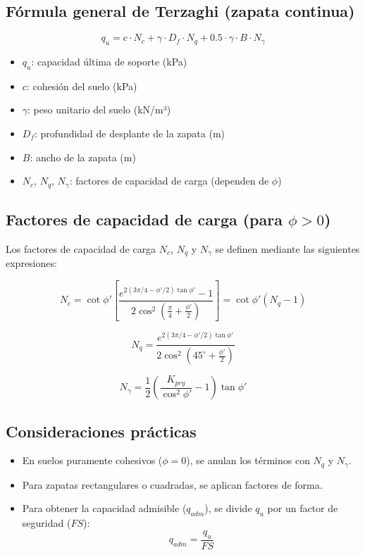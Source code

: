 \documentclass{article} %
\begin{document}
\subsection*{Fórmula general de Terzaghi (zapata continua)}

\[
q_u = c \cdot N_c + \gamma \cdot D_f \cdot N_q + 0.5 \cdot \gamma \cdot B \cdot N_\gamma
\]

\begin{itemize}
    \item $q_u$: capacidad última de soporte (kPa)
    \item $c$: cohesión del suelo (kPa)
    \item $\gamma$: peso unitario del suelo (kN/m³)
    \item $D_f$: profundidad de desplante de la zapata (m)
    \item $B$: ancho de la zapata (m)
    \item $N_c$, $N_q$, $N_\gamma$: factores de capacidad de carga (dependen de $\phi$)
\end{itemize}

\subsection*{Factores de capacidad de carga (para $\phi > 0$)}

Los factores de capacidad de carga $N_c$, $N_q$ y $N_\gamma$ se definen mediante las siguientes expresiones:

\begin{equation}
N_c = \cot \phi' \left[ 
\frac{e^{2(3\pi/4 - \phi'/2)\tan \phi'} - 1}{2 \cos^2\left( \frac{\pi}{4} + \frac{\phi'}{2} \right)} 
\right] 
= \cot \phi' (N_q - 1)
\end{equation}

\begin{equation}
N_q = 
\frac{e^{2(3\pi/4 - \phi'/2)\tan \phi'}}{2 \cos^2\left( 45^\circ + \frac{\phi'}{2} \right)}
\end{equation}

\begin{equation}
N_\gamma = \frac{1}{2} \left( \frac{K_{pry}}{\cos^2 \phi'} - 1 \right) \tan \phi'
\end{equation}

\subsection*{Consideraciones prácticas}
\begin{itemize}
    \item En suelos puramente cohesivos ($\phi = 0$), se anulan los términos con $N_q$ y $N_\gamma$.
    \item Para zapatas rectangulares o cuadradas, se aplican factores de forma.
    \item Para obtener la capacidad admisible ($q_{adm}$), se divide $q_u$ por un factor de seguridad ($FS$):
    \[
    q_{adm} = \frac{q_u}{FS}
    \]
\end{itemize}
\end{document}
